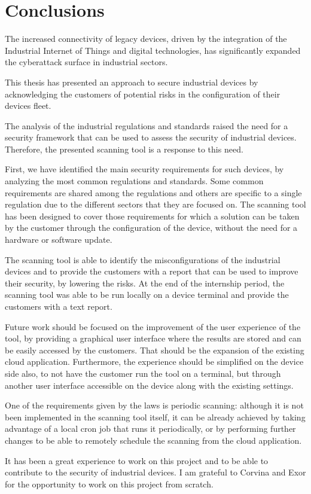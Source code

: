 \chapter{Conclusions}

The increased connectivity of legacy devices, driven by the integration of the Industrial Internet of Things and digital technologies, has significantly expanded the cyberattack surface in industrial sectors.

This thesis has presented an approach to secure industrial devices by acknowledging the customers of potential risks in the configuration of their devices fleet.

The analysis of the industrial regulations and standards raised the need for a security framework that can be used to assess the security of industrial devices. Therefore, the presented scanning tool is a response to this need.

First, we have identified the main security requirements for such devices, by analyzing the most common regulations and standards. Some common requirements are shared among the regulations and others are specific to a single regulation due to the different sectors that they are focused on. The scanning tool has been designed to cover those requirements for which a solution can be taken by the customer through the configuration of the device, without the need for a hardware or software update.

The scanning tool is able to identify the misconfigurations of the industrial devices and to provide the customers with a report that can be used to improve their security, by lowering the risks. At the end of the internship period, the scanning tool was able to be run locally on a device terminal and provide the customers with a text report.

Future work should be focused on the improvement of the user experience of the tool, by providing a graphical user interface where the results are stored and can be easily accessed by the customers. That should be the expansion of the existing cloud application. Furthermore, the experience should be simplified on the device side also, to not have the customer run the tool on a terminal, but through another user interface accessible on the device along with the existing settings.

One of the requirements given by the laws is periodic scanning: although it is not been implemented in the scanning tool itself, it can be already achieved by taking advantage of a local cron job that runs it periodically, or by performing further changes to be able to remotely schedule the scanning from the cloud application.

It has been a great experience to work on this project and to be able to contribute to the security of industrial devices. I am grateful to Corvina and Exor for the opportunity to work on this project from scratch.
